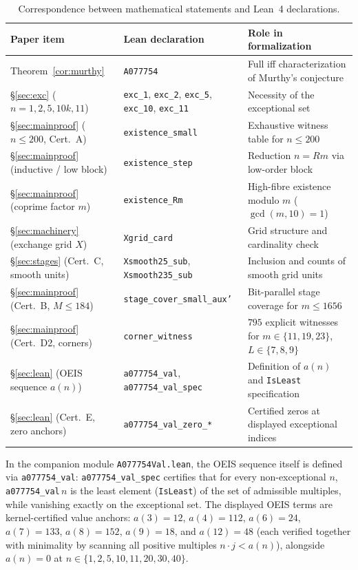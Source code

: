\documentclass[11pt]{article}
\theoremstyle{remark}
\begin{document}
\begin{table}[ht]
\centering
\small
{\footnotesize\setlength{\tabcolsep}{4pt}
\begin{tabular}{llp{6.2cm}}
\hline
Paper item & Lean declaration & Role in formalization \\
\hline
Theorem~\ref{cor:murthy} & \texttt{A077754} & Full iff characterization of Murthy's conjecture \\
\S\ref{sec:exc} ($n=1,2,5,10k,11$) & \texttt{exc\_1}, \texttt{exc\_2}, \texttt{exc\_5}, \texttt{exc\_10}, \texttt{exc\_11} & Necessity of the exceptional set \\
\S\ref{sec:mainproof} ($n \le 200$, Cert.\ A) & \texttt{existence\_small} & Exhaustive witness table for $n \le 200$ \\
\S\ref{sec:mainproof} (inductive / low block) & \texttt{existence\_step} & Reduction $n = R m$ via low-order block \\
\S\ref{sec:mainproof} (coprime factor $m$) & \texttt{existence\_Rm} & High-fibre existence modulo $m$ ($\gcd(m,10)=1$) \\
\S\ref{sec:machinery} (exchange grid $X$) & \texttt{Xgrid\_card} & Grid structure and cardinality check \\
\S\ref{sec:stages} (Cert.\ C, smooth units) & \texttt{Xsmooth25\_sub}, \texttt{Xsmooth235\_sub} & Inclusion and counts of smooth grid units \\
\S\ref{sec:mainproof} (Cert.\ B, $M \le 184$) & \texttt{stage\_cover\_small\_aux'} & Bit-parallel stage coverage for $m \le 1656$ \\
\S\ref{sec:mainproof} (Cert.\ D2, corners) & \texttt{corner\_witness} & $795$ explicit witnesses for $m \in \{11,19,23\}$, $L \in \{7,8,9\}$ \\
\S\ref{sec:lean} (OEIS sequence $a(n)$) & \texttt{a077754\_val}, \texttt{a077754\_val\_spec} & Definition of $a(n)$ and \texttt{IsLeast} specification \\
\S\ref{sec:lean} (Cert.\ E, zero anchors) & \texttt{a077754\_val\_zero\_*} & Certified zeros at displayed exceptional indices \\
\hline
\end{tabular}}
\caption{Correspondence between mathematical statements and Lean~4 declarations.}
\label{tab:lean}
\end{table}

In the companion module \texttt{A077754Val.lean}, the OEIS sequence itself is
defined via \texttt{a077754\_val}: \texttt{a077754\_val\_spec} certifies that
for every non-exceptional $n$, \texttt{a077754\_val}\,$n$ is the least element
(\texttt{IsLeast}) of the set of admissible multiples, while vanishing exactly
on the exceptional set. The displayed OEIS terms are kernel-certified value
anchors: $a(3)=12$, $a(4)=112$, $a(6)=24$, $a(7)=133$, $a(8)=152$, $a(9)=18$,
and $a(12)=48$ (each verified together with minimality by scanning all positive
multiples $n\cdot j < a(n)$), alongside $a(n)=0$ at
$n \in \{1,2,5,10,11,20,30,40\}$.
\end{document}
